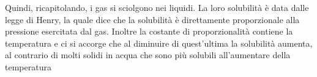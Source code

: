 \vspace{0.2cm}Quindi, ricapitolando, i gas si sciolgono nei liquidi. La loro solubilità è data dalle legge di Henry, la quale dice che la solubilità è direttamente proporzionale alla pressione esercitata dal gas. Inoltre la costante di proporzionalità contiene la temperatura e ci si accorge che al diminuire di quest'ultima la solubilità aumenta, al contrario di molti solidi in acqua che sono più solubili all'aumentare della temperatura